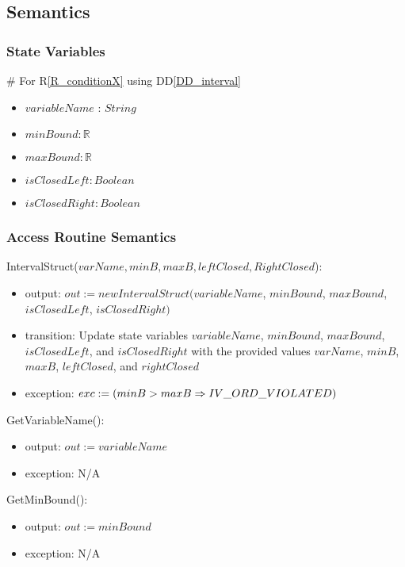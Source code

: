 \documentclass[12pt, titlepage]{article}
\newcommand{\rref}[1]{R\ref{#1}}
\newcommand{\ddref}[1]{DD\ref{#1}}
\begin{document}
\subsection{Semantics}

\subsubsection{State Variables}

\# For \rref{R_conditionX} using \ddref{DD_interval}
\begin{itemize}
	\item $variableName$ : $String$
	\item $minBound : \mathbb{R}$
	\item $maxBound : \mathbb{R}$
	\item $isClosedLeft : Boolean$
	\item $isClosedRight : Boolean$
\end{itemize}

\subsubsection{Access Routine Semantics}

\noindent IntervalStruct($varName, minB, maxB, leftClosed, RightClosed$):
\begin{itemize}
	\item output: $out := new IntervalStruct(variableName$, $minBound$, 
	$maxBound$, $isClosedLeft$, $isClosedRight)$
	\item transition: Update state variables $variableName$, $minBound$, 
	$maxBound$, $isClosedLeft$, and $isClosedRight$ with the provided values 
	$varName$, $minB$, $maxB$, $leftClosed$, and $rightClosed$
	\item exception: $exc := \\
	(minB > maxB \Rightarrow IV\_ORD\_VIOLATED)$
\end{itemize}

\noindent GetVariableName():
\begin{itemize}
	\item output: $out := variableName$
	\item exception: N/A
\end{itemize}

\noindent GetMinBound():
\begin{itemize}
	\item output: $out := minBound$
	\item exception: N/A
\end{itemize}
\end{document}
